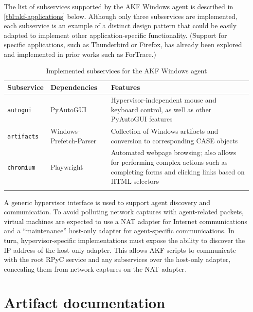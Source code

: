 \documentclass[final,5p,times,twocolumn]{elsarticle}
\newcommand{\passthrough}[1]{#1}
\begin{document}
The list of subservices supported by the AKF Windows agent is described
in \autoref{tbl:akf-applications} below. Although only three subservices
are implemented, each subservice is an example of a distinct design
pattern that could be easily adapted to implement other
application-specific functionality. (Support for specific applications,
such as Thunderbird or Firefox, has already been explored and
implemented in prior works such as ForTrace.)


\begin{table}[tb]
\footnotesize
\centering
\begin{tabularx}{\linewidth}{L{0.2} L{0.2} L{0.6}}
\toprule
  \textbf{Subservice} & \textbf{Dependencies} & \textbf{Features} \\
\midrule
  \passthrough{\lstinline!autogui!} & PyAutoGUI
  \cite{sweigartAsweigartPyautogui2025a} & Hypervisor-independent
  mouse and keyboard control, as well as other PyAutoGUI features \\
  \passthrough{\lstinline!artifacts!} & Windows-Prefetch-Parser
  \cite{wittPoorBillionaireWindowsPrefetchParser2025} & Collection of
  Windows artifacts and conversion to corresponding CASE objects \\
  \passthrough{\lstinline!chromium!} & Playwright
  \cite{MicrosoftPlaywrightpython2025} & Automated webpage browsing;
  also allows for performing complex actions such as completing forms and
  clicking links based on HTML selectors \\ \\
\bottomrule
\end{tabularx}
\caption{Implemented subservices for the AKF Windows agent}\label{tbl:akf-applications}
\end{table}


A generic hypervisor interface is used to support agent discovery and
communication. To avoid polluting network captures with agent-related
packets, virtual machines are expected to use a NAT adapter for Internet
communications and a ``maintenance'' host-only adapter for
agent-specific communications. In turn, hypervisor-specific
implementations must expose the ability to discover the IP address of
the host-only adapter. This allows AKF scripts to communicate with the
root RPyC service and any subservices over the host-only adapter,
concealing them from network captures on the NAT adapter.

\section{Artifact documentation}\label{artifact-documentation}
\end{document}
